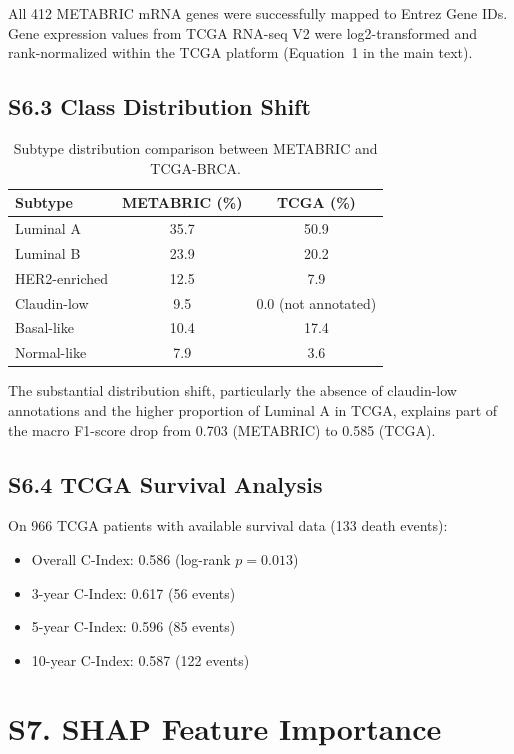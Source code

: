 \documentclass[11pt,a4paper]{article}
\begin{document}
All 412 METABRIC mRNA genes were successfully mapped to Entrez Gene IDs. Gene expression values from TCGA RNA-seq V2 were log2-transformed and rank-normalized within the TCGA platform (Equation~1 in the main text).

\subsection*{S6.3 Class Distribution Shift}

\begin{table}[H]
\centering
\caption{Subtype distribution comparison between METABRIC and TCGA-BRCA.}
\label{supp:tab:dist_shift}
\begin{tabular}{lcc}
\toprule
\textbf{Subtype} & \textbf{METABRIC (\%)} & \textbf{TCGA (\%)} \\
\midrule
Luminal A & 35.7 & 50.9 \\
Luminal B & 23.9 & 20.2 \\
HER2-enriched & 12.5 & 7.9 \\
Claudin-low & 9.5 & 0.0 (not annotated) \\
Basal-like & 10.4 & 17.4 \\
Normal-like & 7.9 & 3.6 \\
\bottomrule
\end{tabular}
\end{table}

The substantial distribution shift, particularly the absence of claudin-low annotations and the higher proportion of Luminal A in TCGA, explains part of the macro F1-score drop from 0.703 (METABRIC) to 0.585 (TCGA).

\subsection*{S6.4 TCGA Survival Analysis}

On 966 TCGA patients with available survival data (133 death events):
\begin{itemize}[nosep]
  \item Overall C-Index: 0.586 (log-rank $p = 0.013$)
  \item 3-year C-Index: 0.617 (56 events)
  \item 5-year C-Index: 0.596 (85 events)
  \item 10-year C-Index: 0.587 (122 events)
\end{itemize}

\section*{S7. SHAP Feature Importance}
\label{supp:shap}
\end{document}

